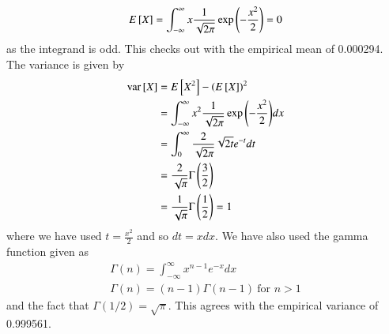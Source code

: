 \documentclass[journal,12pt,twocolumn]{IEEEtran}
\renewcommand\thesection{\arabic{section}}
\begin{document}
\begin{enumerate}[label=\thesection.\arabic*
,ref=\thesection.\theenumi]
\begin{align}
			E{}\left[X\right] = \int_{-\infty}^{\infty}x\frac{1}{\sqrt{2\pi}}\exp{\left(-\frac{x^2}{2}\right)} = 0
			\label{eq:gau-mean}
		\end{align}
as the integrand is odd. This checks out with the empirical mean of 0.000294. The variance is given by
		\begin{align}
			\text{var}{}\left[X\right] &= E{}\left[X^2\right] - \left(E{}\left[X\right]\right)^2 \\
			&= \int_{-\infty}^{\infty}x^2\frac{1}{\sqrt{2\pi}}\exp{\left(-\frac{x^2}{2}\right)}dx \label{eq:int} \\
			&= \int_{0}^{\infty}\frac{2}{\sqrt{2\pi}}\sqrt{2t}e^{-t}dt \\
			&= \frac{2}{\sqrt{\pi}}\Gamma\left(\frac{3}{2}\right) \\
			&= \frac{1}{\sqrt{\pi}}\Gamma\left(\frac{1}{2}\right) = 1
			\label{eq:gau-var}
		\end{align}
where we have used $t = \frac{x^2}{2}$ and so $dt = xdx$. We have also used the gamma function given as
\begin{align}
	\Gamma(n) = \int_{-\infty}^{\infty}x^{n - 1}e^{-x}dx \\
	\Gamma(n) = (n - 1)\Gamma(n - 1)\ \text{for $n > 1$}
\end{align}
and the fact that $\Gamma(1/2) = \sqrt{\pi}$.
This agrees with the empirical variance of 0.999561.
%
\end{enumerate}
\end{document}

